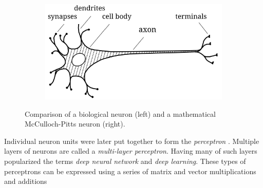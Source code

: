 \begin{figure}[ht]
    \centering
    \begin{subfigure}{0.49\textwidth}
        \raggedright
        \includegraphics[width=\textwidth]{assets/bio_neuron.pdf}
    \end{subfigure}
    \begin{subfigure}{0.5\textwidth}
        \raggedleft
    \end{subfigure}
    \caption{Comparison of a biological neuron \cite{bio-neuron} (left) and a mathematical McCulloch-Pitts neuron (right).}
    \label{fig:neuron}
\end{figure}
Individual neuron units were later put together to form the \textit{perceptron} \cite{first-perceptron}. Multiple layers of neurons are called a \textit{multi-layer perceptron}. Having many of such layers popularized the terms \textit{deep neural network} and \textit{deep learning}. These types of perceptrons can be expressed using a series of matrix and vector multiplications and additions
